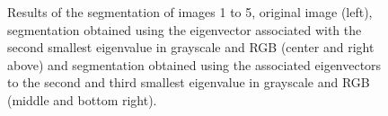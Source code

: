 \documentclass[conference]{IEEEtran}
\theoremstyle{definition}
\begin{document}
\begin{figure}[htbp]
\caption{Results of the segmentation of images 1 to 5, original image (left), segmentation obtained using the eigenvector associated with the second smallest eigenvalue in grayscale and RGB (center and right above) and segmentation obtained using the associated eigenvectors to the second and third smallest eigenvalue in grayscale and RGB (middle and bottom right).}
\label{res1}
\end{figure}
\end{document}
